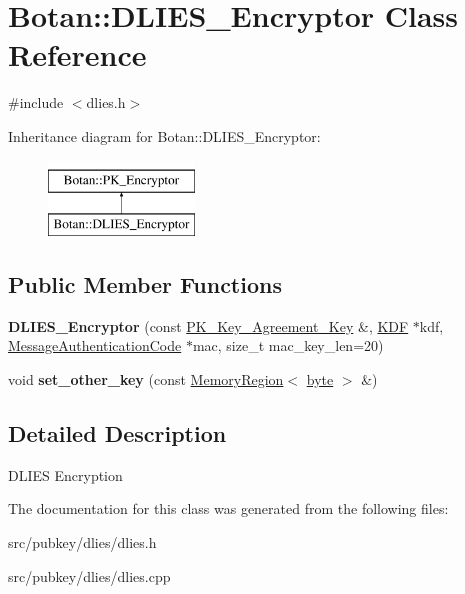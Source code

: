\hypertarget{classBotan_1_1DLIES__Encryptor}{\section{Botan\-:\-:D\-L\-I\-E\-S\-\_\-\-Encryptor Class Reference}
\label{classBotan_1_1DLIES__Encryptor}
}


{\ttfamily \#include $<$dlies.\-h$>$}

Inheritance diagram for Botan\-:\-:D\-L\-I\-E\-S\-\_\-\-Encryptor\-:\begin{figure}[H]
\begin{center}
\leavevmode
\includegraphics[height=2.000000cm]{classBotan_1_1DLIES__Encryptor}
\end{center}
\end{figure}
\subsection*{Public Member Functions}
\begin{DoxyCompactItemize}
\item 
\hypertarget{classBotan_1_1DLIES__Encryptor_a65d7aa13287a5f742246ad5b03747f57}{{\bfseries D\-L\-I\-E\-S\-\_\-\-Encryptor} (const \hyperlink{classBotan_1_1PK__Key__Agreement__Key}{P\-K\-\_\-\-Key\-\_\-\-Agreement\-\_\-\-Key} \&, \hyperlink{classBotan_1_1KDF}{K\-D\-F} $\ast$kdf, \hyperlink{classBotan_1_1MessageAuthenticationCode}{Message\-Authentication\-Code} $\ast$mac, size\-\_\-t mac\-\_\-key\-\_\-len=20)}\label{classBotan_1_1DLIES__Encryptor_a65d7aa13287a5f742246ad5b03747f57}

\item 
\hypertarget{classBotan_1_1DLIES__Encryptor_af55fc4e5cf0321707ab33aee746c2a95}{void {\bfseries set\-\_\-other\-\_\-key} (const \hyperlink{classBotan_1_1MemoryRegion}{Memory\-Region}$<$ \hyperlink{namespaceBotan_a7d793989d801281df48c6b19616b8b84}{byte} $>$ \&)}\label{classBotan_1_1DLIES__Encryptor_af55fc4e5cf0321707ab33aee746c2a95}

\end{DoxyCompactItemize}


\subsection{Detailed Description}
D\-L\-I\-E\-S Encryption 

The documentation for this class was generated from the following files\-:\begin{DoxyCompactItemize}
\item 
src/pubkey/dlies/dlies.\-h\item 
src/pubkey/dlies/dlies.\-cpp\end{DoxyCompactItemize}
